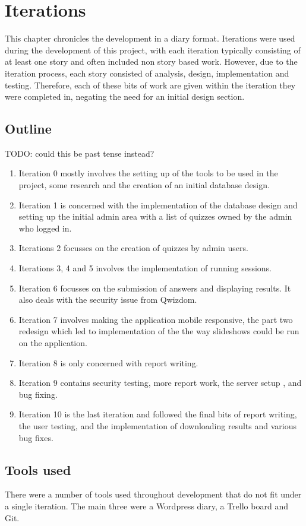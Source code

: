 \chapter{Iterations}
This chapter chronicles the development in a diary format. Iterations were used during the development of this project, with each iteration typically consisting of at least one story and often included non story based work. However, due to the iteration process, each story consisted of analysis, design, implementation and testing. Therefore, each of these bits of work are given within the iteration they were completed in, negating the need for an initial design section.

\section{Outline}
TODO: could this be past tense instead?
\begin{enumerate}
	\item Iteration 0 mostly involves the setting up of the tools to be used in the project, some research and the creation of an initial database design.
	\item Iteration 1 is concerned with the implementation of the database design and setting up the initial admin area with a list of quizzes owned by the admin who logged in.
	\item Iterations 2 focusses on the creation of quizzes by admin users.
	\item Iterations 3, 4 and 5 involves the implementation of running sessions.
	\item Iteration 6 focusses on the submission of answers and displaying results. It also deals with the security issue from Qwizdom.
	\item Iteration 7 involves making the application mobile responsive, the part two redesign which led to implementation of the the way slideshows could be run on the application.
	\item Iteration 8 is only concerned with report writing.
	\item Iteration 9 contains security testing, more report work, the server setup , and bug fixing.
	\item Iteration 10 is the last iteration and followed the final bits of report writing, the user testing, and the implementation of downloading results and various bug fixes.
\end{enumerate}

\section{Tools used}
There were a number of tools used throughout development that do not fit under a single iteration. The main three were a Wordpress diary, a Trello board and Git. 


